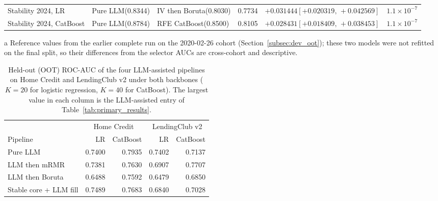 \documentclass[final,5p,twocolumn]{elsarticle}
\newcommand{\Kfeat}{K}
\begin{document}
\begin{table}[htbp]
\begin{threeparttable}
\begin{tabular}{@{}L{21mm}L{25mm}L{22mm}rL{36mm}r@{}}
\addlinespace
Stability 2024, LR & Pure LLM\newline (0.8344) & IV then Boruta\newline (0.8030) & 0.7734 & $+0.031444$\newline $[+0.020319,\,+0.042569]$ & $1.1\times10^{-7}$ \\
\addlinespace
Stability 2024, CatBoost & Pure LLM\newline (0.8784) & RFE CatBoost\newline (0.8500) & 0.8105 & $+0.028431$\newline $[+0.018409,\,+0.038453]$ & $1.1\times10^{-7}$ \\
\bottomrule
\end{tabular}
\begin{tablenotes}\scriptsize
\item[a] Reference values from the earlier complete run on the 2020-02-26 cohort (Section~\ref{subsec:dev_oot}); these two models were not refitted on the final split, so their differences from the selector AUCs are cross-cohort and descriptive.
\end{tablenotes}
\end{threeparttable}
\end{table}

\begin{table}[htbp]
\centering
\footnotesize
\caption{Held-out (OOT) ROC-AUC of the four LLM-assisted pipelines on Home Credit and LendingClub v2 under both backbones ($\Kfeat=20$ for logistic regression, $\Kfeat=40$ for CatBoost). The largest value in each column is the LLM-assisted entry of Table~\ref{tab:primary_results}.}
\label{tab:llm_pipelines}
\setlength{\tabcolsep}{4pt}
\begin{tabular}{@{}lrrrr@{}}
\toprule
 & \multicolumn{2}{c}{Home Credit} & \multicolumn{2}{c}{LendingClub v2} \\
\cmidrule(lr){2-3}\cmidrule(l){4-5}
Pipeline & LR & CatBoost & LR & CatBoost \\
\midrule
Pure LLM & 0.7400 & 0.7935 & 0.7402 & 0.7137 \\
LLM then mRMR & 0.7381 & 0.7630 & 0.6907 & 0.7707 \\
LLM then Boruta & 0.6488 & 0.7592 & 0.6479 & 0.6850 \\
Stable core + LLM fill & 0.7489 & 0.7683 & 0.6840 & 0.7028 \\
\bottomrule
\end{tabular}
\end{table}
\end{document}

